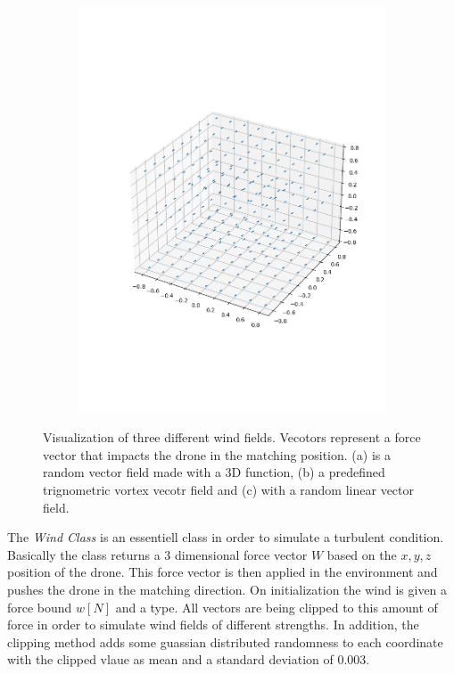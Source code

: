 \begin{figure}
\begin{subfigure}{0.32\linewidth}
		\includegraphics[width=\linewidth]{figures/wind3.png}
		\caption{}
		\label{fig:wind0}
	\end{subfigure}
	\caption{Visualization of three different wind fields. Vecotors represent a force vector that impacts the drone in the matching position. (a)  is a random vector field made with a 3D function, (b) a predefined trignometric vortex vecotr field and (c) with a random linear vector field.}
\end{figure}
The \emph{Wind Class} is an essentiell class in order to simulate a turbulent condition. Basically the class returns a 3 dimensional force vector $W$ based on the $x,y,z$ position of the drone. This force vector is then applied in the environment and pushes the drone in the matching direction. On initialization the wind is given a force bound $w [N]$ and a type. All vectors are being clipped to this amount of force in order to simulate wind fields of different strengths. In addition, the clipping method adds some guassian distributed randomness to each coordinate with the clipped vlaue as mean and a standard deviation of $0.003$. \\
